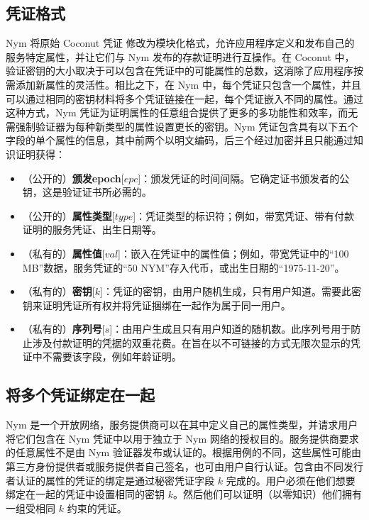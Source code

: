 \documentclass{article}
\begin{document}
	\subsection{凭证格式}

	Nym 将原始 Coconut 凭证 \cite{ref101} 修改为模块化格式，允许应用程序定义和发布自己的服务特定属性，并让它们与 Nym 发布的存款证明进行互操作。在 Coconut 中，验证密钥的大小取决于可以包含在凭证中的可能属性的总数，这消除了应用程序按需添加新属性的灵活性。相比之下，在 Nym 中，每个凭证只包含一个属性，并且可以通过相同的密钥材料将多个凭证链接在一起，每个凭证嵌入不同的属性。通过这种方式，Nym 凭证为证明属性的任意组合提供了更多的多功能性和效率，而无需强制验证器为每种新类型的属性设置更长的密钥。Nym 凭证包含具有以下五个字段的单个属性的信息，其中前两个以明文编码，后三个经过加密并且只能通过知识证明获得：\newline
	
\begin{itemize}
\item （公开的）\textbf{颁发epoch}[$epc$]：颁发凭证的时间间隔。它确定证书颁发者的公钥，这是验证证书所必需的。
\item （公开的）\textbf{属性类型}[$type$]：凭证类型的标识符；例如，带宽凭证、带有付款证明的服务凭证、出生日期等。
\item （私有的）\textbf{属性值}[$val$]：嵌入在凭证中的属性值；例如，带宽凭证中的“100 MB”数据，服务凭证的“50 NYM”存入代币，或出生日期的“1975-11-20”。
\item （私有的）\textbf{密钥}[$k$]：凭证的密钥，由用户随机生成，只有用户知道。需要此密钥来证明凭证所有权并将凭证捆绑在一起作为属于同一用户。
\item （私有的）\textbf{序列号}[$s$]：由用户生成且只有用户知道的随机数。此序列号用于防止涉及付款证明的凭据的双重花费。在旨在以不可链接的方式无限次显示的凭证中不需要该字段，例如年龄证明。
\end{itemize}

	\subsection{将多个凭证绑定在一起}

	Nym 是一个开放网络，服务提供商可以在其中定义自己的属性类型，并请求用户将它们包含在 Nym 凭证中以用于独立于 Nym 网络的授权目的。服务提供商要求的任意属性不是由 Nym 验证器发布或认证的。根据用例的不同，这些属性可能由第三方身份提供者或服务提供者自己签名，也可由用户自行认证。包含由不同发行者认证的属性的凭证的绑定是通过秘密凭证字段 $k$ 完成的。用户必须在他们想要绑定在一起的凭证中设置相同的密钥 $k$。然后他们可以证明（以零知识）他们拥有一组受相同 $k$ 约束的凭证。\newline
\end{document}
